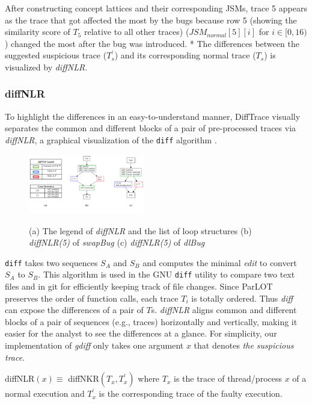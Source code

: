 After constructing concept lattices and their corresponding JSMs, trace 5 appears as the trace that got affected the most by the bugs because row 5 (showing the similarity score of $T_5$ relative to all other traces) ($JSM_{normal}[5][i]$ for $i \in [0,16)$) changed the most after the bug was introduced. %
*
The differences between the suggested suspicious trace ($T^\prime_s$) and its corresponding normal trace ($T_s$) is visualized by \textit{diffNLR}.

\subsubsection{diffNLR}
To highlight the differences in an easy-to-understand manner, DiffTrace visually separates the common and different blocks of a pair of pre-processed traces via \textit{diffNLR}, a graphical visualization of the \texttt{diff} algorithm \cite{diff-myers}.
%

\begin{figure}[]
\centering
\caption{(a) The legend of \textit{diffNLR} and the list of loop structures (b) \textit{diffNLR(5)} of \textit{swapBug} (c) \textit{diffNLR(5)} of \textit{dlBug}}
\includegraphics[width=0.45\textwidth]{figs/sampleGdiff.png}
\label{fig.gdiffs}
\end{figure}


\texttt{diff} takes two sequences $S_A$ and $S_B$ and computes the minimal \textit{edit} to convert $S_A$ to $S_B$. This algorithm is used in the GNU \texttt{diff} utility to compare two text files and in git for efficiently keeping track of file changes.
Since ParLOT preserves the order of function calls, each trace $T_i$ is totally ordered. Thus \textit{diff} can expose the differences of a pair of $T$s. \textit{diffNLR} aligns common and different blocks of a pair of sequences (e.g., traces) horizontally and vertically, making it easier for the analyst to see the differences at a glance.
For simplicity, our implementation of \textit{gdiff} only takes one argument $x$ that denotes \textit{the suspicious trace}.

diffNLR$(x) \equiv $ diffNKR$(T_x,T_x^\prime)$
%
where $T_x$ is the trace of thread/process $x$ of a normal execution and $T^\prime_x$ is the corresponding trace of the faulty execution.

